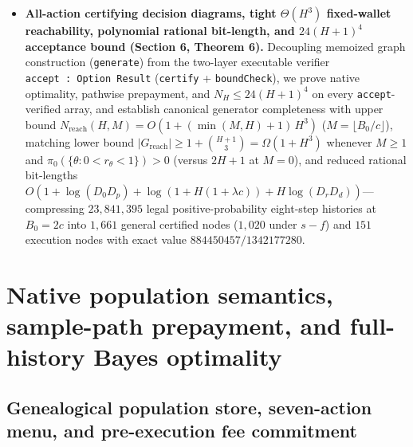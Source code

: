 \documentclass[11pt,a4paper]{article}
\begin{document}
\begin{itemize}
{  (Section 5.2, Theorem 5).} We prove that the five-coordinate
  operational summary \(\sigma = (t, q, s, f, k)\) preserves feasible
  action menus and single-step joint distributions for \emph{every}
  legal action across arbitrary finite priors (further collapsing
  \((s,f)\) to net-success log-odds \(\delta = s - f\) under
  complementary two-point priors \(r_1 = 1 - r_0\)), while reachable
  witnesses prove physical-Markov insufficiency (\(5/8 \neq 1/2\)),
  lawful genealogy-erasing history mergers across all legal actions, and
  immediate separation if slot-2 dispatch is added (\(0\)
  vs.~\(r_\theta\)).
\item
  \textbf{All-action certifying decision diagrams, tight \(\Theta(H^3)\)
  fixed-wallet reachability, polynomial rational bit-length, and
  \(24(H+1)^4\) acceptance bound (Section 6, Theorem 6).} Decoupling
  memoized graph construction (\texttt{generate}) from the two-layer
  executable verifier \texttt{accept\ :\ Option\ Result}
  (\texttt{certify} + \texttt{boundCheck}), we prove native optimality,
  pathwise prepayment, and \(N_H \le 24(H+1)^4\) on every
  \texttt{accept}-verified array, and establish canonical generator
  completeness with upper bound
  \(N_{\mathrm{reach}}(H, M) = O(1 + (\min(M, H) + 1)\,H^3)\)
  (\(M = \lfloor B_0/c\rfloor\)), matching lower bound
  \(|G_{\mathrm{reach}}| \ge 1 + \binom{H+1}{3} = \Omega(1 + H^3)\)
  whenever \(M \ge 1\) and \(\pi_0(\{\theta : 0 < r_\theta < 1\}) > 0\)
  (versus \(2H + 1\) at \(M = 0\)), and reduced rational bit-lengths
  \(O(1 + \log(D_0 D_p) + \log(1 + H(1 + \lambda c)) + H\log(D_r D_d))\)---compressing
  \(23,841,395\) legal positive-probability eight-step histories at
  \(B_0 = 2c\) into \(1,661\) general certified nodes (\(1,020\) under
  \(s - f\)) and \(151\) execution nodes with exact value
  \(884450457 / 1342177280\).
\end{itemize}

\section{Native population semantics, sample-path prepayment, and
full-history Bayes
optimality}\label{native-population-semantics-sample-path-prepayment-and-full-history-bayes-optimality}

\subsection{Genealogical population store, seven-action menu, and
pre-execution fee
commitment}\label{genealogical-population-store-seven-action-menu-and-pre-execution-fee-commitment}
\end{document}
